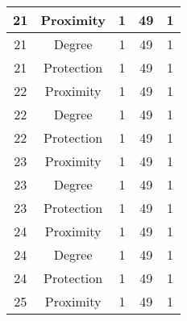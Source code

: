 \documentclass[results.tex]{subfiles}
\begin{document}
\begin{center}
\begin{tabular}{| c || c | c | c | c |}
            \hline
            21                      & Proximity                    & 1                      & 49                      & 1                    \\
            \hline
            21                      & Degree                       & 1                      & 49                      & 1                    \\
            \hline
            21                      & Protection                   & 1                      & 49                      & 1                    \\
            \hline
            22                      & Proximity                    & 1                      & 49                      & 1                    \\
            \hline
            22                      & Degree                       & 1                      & 49                      & 1                    \\
            \hline
            22                      & Protection                   & 1                      & 49                      & 1                    \\
            \hline
            23                      & Proximity                    & 1                      & 49                      & 1                    \\
            \hline
            23                      & Degree                       & 1                      & 49                      & 1                    \\
            \hline
            23                      & Protection                   & 1                      & 49                      & 1                    \\
            \hline
            24                      & Proximity                    & 1                      & 49                      & 1                    \\
            \hline
            24                      & Degree                       & 1                      & 49                      & 1                    \\
            \hline
            24                      & Protection                   & 1                      & 49                      & 1                    \\
            \hline
            25                      & Proximity                    & 1                      & 49                      & 1                    \\

\end{tabular}
\end{center}
\end{document}
